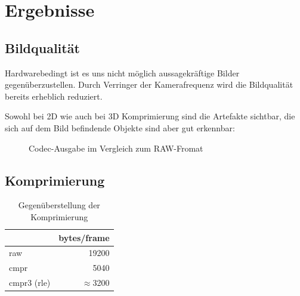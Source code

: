 
\chapter{Ergebnisse}

\section{Bildqualität}
Hardwarebedingt ist es uns nicht m\"oglich aussagekr\"aftige Bilder 
gegen\"uberzustellen. Durch Verringer der Kamerafrequenz wird die Bildqualit\"at bereits erheblich reduziert. 

Sowohl bei 2D wie auch bei 3D Komprimierung sind die Artefakte sichtbar,
die sich auf dem Bild befindende Objekte sind aber gut erkennbar:

\begin{figure}[htpb]
\begin{center}
\end{center}
\caption{Codec-Ausgabe im Vergleich zum RAW-Fromat}
\label{fig:sample}
\end{figure}

\section{Komprimierung}
\begin{table}[hp]
\centering
\begin{tabular}{|l|r|}
\hline
            & bytes/frame   \\
\hline
raw         & 19200         \\
cmpr        &  5040         \\
cmpr3 (rle) & $\approx$3200 \\
\hline
\end{tabular}
\caption{Gegen\"uberstellung der Komprimierung}
\end{table}

